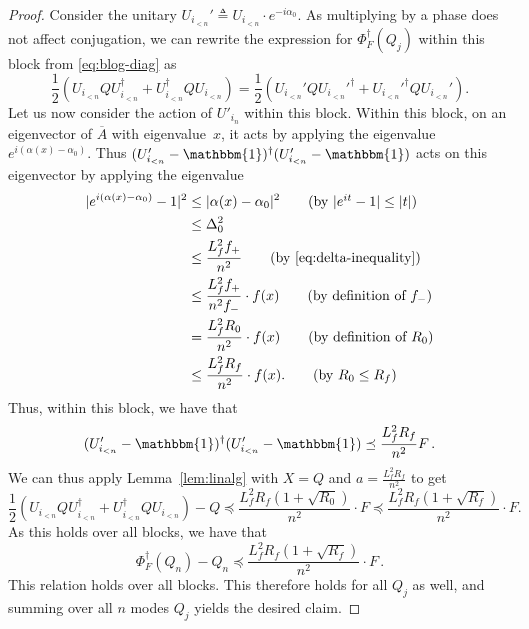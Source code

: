 \documentclass[10pt]{article}
\newcommand{\luders}{\Phi}
\newcommand{\Id}{\mathbbm{1}}
\newcommand{\lift}[1]{\overline{#1}}
\begin{document}
\begin{proof}
    Consider the unitary $ U_{i_{<n}}'
        \triangleq U_{i_{<n}} \cdot e^{-i \alpha_0}$. 
    As multiplying by a phase does not affect conjugation, we can rewrite the expression for $\luders^\dagger_F(Q_j)$ within this block
    from \eqref{eq:blog-diag}
    as
    \begin{equation*}
        \frac{1}{2}(U_{i_{<n}} Q U_{i_{<n}} ^\dagger + U_{i_{<n}} ^\dagger Q U_{i_{<n}} )
        =\frac{1}{2}(U_{i_{<n}}' Q U_{i_{<n}}'^\dagger + U_{i_{<n}}'^\dagger Q U_{i_{<n}}').
    \end{equation*}
    Let us now consider the action of $U'_{i_{n}}$ within this block. 
    Within this block, on an eigenvector of $\lift{A}$ with eigenvalue~$x$, it acts by applying the eigenvalue $e^{i(\alpha(x) - \alpha_0)}$. Thus $(U'_{i_{<n}} - \Id)^{\dagger} (U'_{i_{<n}} - \Id)$ acts on this eigenvector by applying the eigenvalue
    \begin{align*}
        |e^{i(\alpha(x) - \alpha_0)} - 1|^2 &\leq |\alpha(x) - \alpha_0|^2 \tag*{\text{(by $|e^{it} - 1| \le |t|$)}}\\
        &\leq \Delta_0^2\\
        &\leq \frac{L_f^2 f_+}{n^2} \tag*{\text{(by \eqref{eq:delta-inequality})}}\\
        &\leq \frac{L_f^2 f_+}{n^2 f_-} \cdot f(x) \tag*{\text{(by definition of $f_-$)}}\\
        &= \frac{L_f^2 R_0}{n^2} \cdot f(x) \tag*{\text{(by definition of $R_0$)}}\\
        &\leq \frac{L_f^2 R_f}{n^2} \cdot f(x). \tag*{\text{(by $R_0 \leq R_f$)}}
    \end{align*}
    Thus, within this block, we have that
    \begin{equation}
        (U'_{i_{<n}} - \Id)^{\dagger} (U'_{i_{<n}} - \Id)
        \preceq \frac{L^2_f R_f}{n^2} F\,.
    \end{equation}
    We can thus apply Lemma~\ref{lem:linalg} with $X = Q$ and $a = \frac{L^2_f R_f}{n^2}$ to get
    \begin{equation}
        \frac{1}{2}(U_{i_{<n}} Q U_{i_{<n}} ^\dagger + U_{i_{<n}} ^\dagger Q U_{i_{<n}} ) - Q
        \preceq \frac{L^2_f R_f (1 + \sqrt{R_0})}{n^2} \cdot F
        \preceq \frac{L^2_f R_f (1 + \sqrt{R_f})}{n^2} \cdot F.
    \end{equation}
    As this holds over all blocks, we  have that
    \begin{equation}
        \luders^\dagger_F(Q_n) - Q_n \preceq \frac{L^2_f R_f (1 + \sqrt{R_f})}{n^2} \cdot F\,.
    \end{equation}
    This relation holds over all blocks.
    This therefore holds for all $Q_j$ as well, and summing over all $n$ modes $Q_j$ yields the desired claim.
\end{proof}
\end{document}
